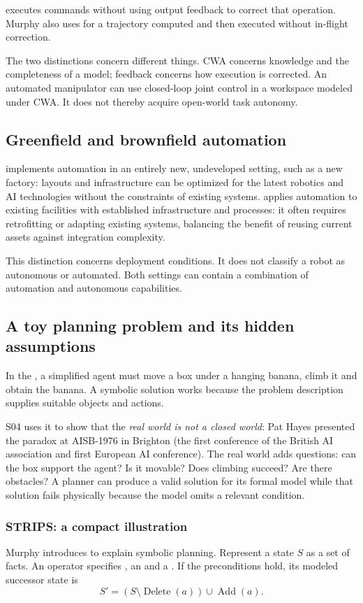  executes commands without using output feedback to correct that operation. Murphy also uses  for a trajectory computed and then executed without in-flight correction.

The two distinctions concern different things. CWA concerns knowledge and the completeness of a model; feedback concerns how execution is corrected. An automated manipulator can use closed-loop joint control in a workspace modeled under CWA. It does not thereby acquire open-world task autonomy.

\subsection{Greenfield and brownfield automation}
 implements automation in an entirely new, undeveloped setting, such as a new factory: layouts and infrastructure can be optimized for the latest robotics and AI technologies without the constraints of existing systems.  applies automation to existing facilities with established infrastructure and processes: it often requires retrofitting or adapting existing systems, balancing the benefit of reusing current assets against integration complexity.

This distinction concerns deployment conditions. It does not classify a robot as autonomous or automated. Both settings can contain a combination of automation and autonomous capabilities.

\subsection{A toy planning problem and its hidden assumptions}
In the , a simplified agent must move a box under a hanging banana, climb it and obtain the banana. A symbolic solution works because the problem description supplies suitable objects and actions.

S04 uses it to show that the \emph{real world is not a closed world}: Pat Hayes presented the paradox at AISB-1976 in Brighton (the first conference of the British AI association and first European AI conference). The real world adds questions: can the box support the agent? Is it movable? Does climbing succeed? Are there obstacles? A planner can produce a valid solution for its formal model while that solution fails physically because the model omits a relevant condition.

\subsubsection{STRIPS: a compact illustration}
\begin{samepage}Murphy introduces  to explain symbolic planning. Represent a state $S$ as a set of facts. An operator specifies , an  and a . If the preconditions hold, its modeled successor state is
\[
 S'=(S\setminus\operatorname{Delete}(a))\cup\operatorname{Add}(a).
\]\par\end{samepage}


